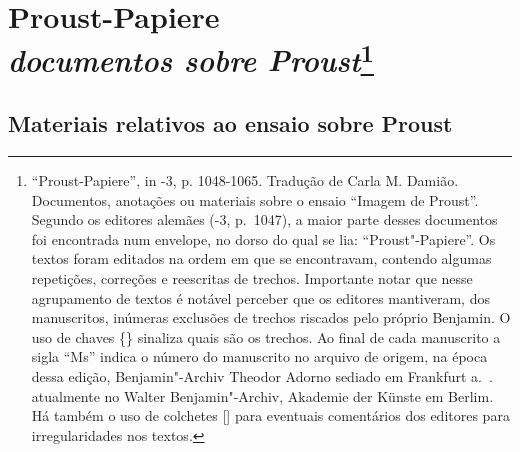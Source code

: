
\chapter*{Proust-Papiere\\ \emph{documentos sobre Proust}\footnote[*]{``Proust-Papiere'', in -3, p. 1048-1065. Tradução de Carla M. Damião. Documentos, anotações ou materiais sobre o ensaio ``Imagem de Proust''. Segundo os editores alemães (-3, p.~1047), a maior parte desses documentos foi encontrada num envelope, no dorso do qual se lia: ``Proust"-Papiere''. Os textos foram editados na ordem em que se encontravam, contendo algumas repetições, correções e reescritas de trechos. Importante notar que nesse agrupamento de textos é notável perceber que os editores mantiveram, dos manuscritos, inúmeras exclusões de trechos riscados pelo próprio Benjamin. O uso de chaves \{\} sinaliza quais são os trechos. Ao final de cada manuscrito a sigla ``Ms'' indica o número do manuscrito no arquivo de origem, na época dessa edição, Benjamin"-Archiv Theodor Adorno sediado em Frankfurt a.~. atualmente no Walter Benjamin"-Archiv, Akademie der Künste em Berlim. Há também o uso de colchetes [] para eventuais comentários dos editores para irregularidades nos textos.}}

\section{Materiais relativos ao ensaio sobre Proust}


